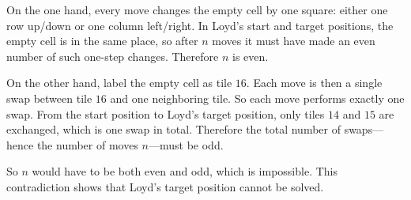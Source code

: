 On the one hand, every move changes the empty cell by one square: either one
row up/down or one column left/right. In Loyd's start and target positions, the
empty cell is in the same place, so after \(n\) moves it must have made an even
number of such one-step changes. Therefore \(n\) is even.

On the other hand, label the empty cell as tile \(16\). Each move is then a
single swap between tile \(16\) and one neighboring tile. So each move performs
exactly one swap. From the start position to Loyd's target position, only tiles
\(14\) and \(15\) are exchanged, which is one swap in total. Therefore the total
number of swaps---hence the number of moves \(n\)---must be odd.

So \(n\) would have to be both even and odd, which is impossible. This
contradiction shows that Loyd's target position cannot be solved. 
